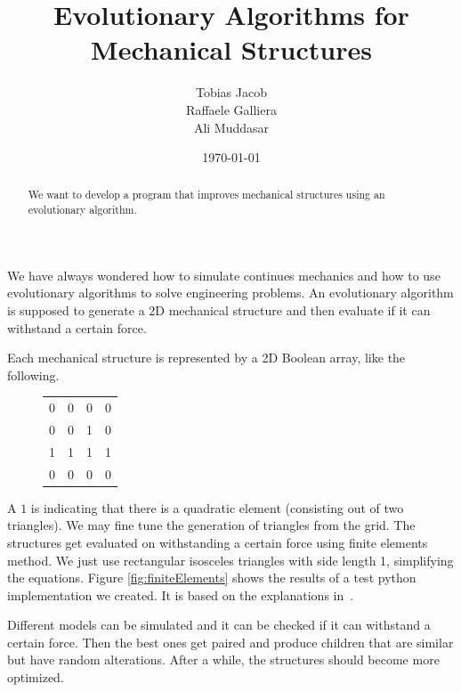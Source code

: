 \documentclass[12pt]{article}
\title{\vspace{-3em}Evolutionary Algorithms for Mechanical Structures}
\author{Tobias Jacob \\ Raffaele Galliera \\ Ali Muddasar}
\date{\today}
\begin{document}
\maketitle

\begin{abstract}
\centering
We want to develop a program that improves mechanical structures using an evolutionary algorithm.
\end{abstract}

We have always wondered how to simulate continues mechanics and how to use evolutionary algorithms to solve engineering problems. An evolutionary algorithm is supposed to generate a 2D mechanical structure and then evaluate if it can withstand a certain force.

\begin{figure}[h]
    \centering
\end{figure}

Each mechanical structure is represented by a 2D Boolean array, like the following.

\begin{figure}[h]
    \centering
    \begin{tabular}{cccc}
        0 & 0 & 0 & 0 \\
        0 & 0 & 1 & 0 \\
        1 & 1 & 1 & 1 \\
        0 & 0 & 0 & 0
    \end{tabular}
\end{figure}

A $1$ is indicating that there is a quadratic element (consisting out of two triangles). We may fine tune the generation of triangles from the grid. The structures get evaluated on withstanding a certain force using finite elements method. We just use rectangular isosceles triangles with side length 1, simplifying the equations. Figure \ref{fig:finiteElements} shows the results of a test python implementation we created. It is based on the explanations in~\cite[p. 15-22]{Nikishkov2004}.

Different models can be simulated and it can be checked if it can withstand a certain force. Then the best ones get paired and produce children that are similar but have random alterations. After a while, the structures should become more optimized.
\end{document}
